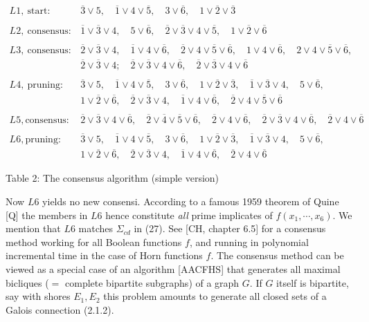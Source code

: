\documentclass[11pt]{article}
\newcommand{\ol}{\overline}
\begin{document}
$\begin{array}{ll}
L1, \ \mbox{start} : & \ol{3} \vee 5, \quad \ol{1} \vee 4 \vee \ol{5}, \quad 3 \vee \ol{6}, \quad 1 \vee \ol{2} \vee \ol{3}\\
\\
L2, \ \mbox{consensus}: & \ol{1} \vee \ol{3} \vee 4, \quad 5 \vee \ol{6}, \quad \ol{2} \vee \ol{3} \vee 4 \vee \ol{5}, \quad 1 \vee \ol{2} \vee \ol{6}\\
\\
L3, \ \mbox{consensus}: &  \ol{2} \vee \ol{3} \vee 4, \quad \ol{1} \vee 4 \vee \ol{6}, \quad \ol{2} \vee 4 \vee \ol{5} \vee \ol{6}, \quad 1 \vee 4 \vee \ol{6}, \quad 2 \vee 4 \vee \ol{5} \vee \ol{6},  \\
& \ol{2} \vee \ol{3} \vee 4; \quad \ol{2} \vee \ol{3} \vee 4 \vee \ol{6}, \quad \ol{2} \vee \ol{3} \vee 4 \vee \ol{6}\\ 
\\
L4, \ \mbox{pruning}: & \ol{3} \vee 5, \quad \ol{1} \vee 4 \vee \ol{5}, \quad 3 \vee \ol{6}, \quad  1 \vee \ol{2} \vee \ol{3}, \quad \ol{1} \vee \ol{3} \vee 4, \quad 5 \vee \ol{6},  \\
& 1 \vee \ol{2} \vee \ol{6}, \quad \ol{2} \vee \ol{3} \vee 4, \quad \ol{1} \vee 4 \vee \ol{6}, \quad \ol{2} \vee 4 \vee \ol{5} \vee \ol{6}\\
\\
L5, \mbox{consensus} : & \ol{2} \vee \ol{3} \vee 4 \vee \ol{6}, \quad \ol{2} \vee \ol{4} \vee \ol{5} \vee \ol{6}, \quad \ol{2} \vee 4 \vee \ol{6}, \quad \ol{2} \vee \ol{3} \vee 4 \vee \ol{6}, \quad \ol{2} \vee 4 \vee \ol{6}\\
\\
L6, \mbox{pruning}: & \ol{3} \vee 5, \quad \ol{1} \vee 4 \vee \ol{5}, \quad 3 \vee \ol{6}, \quad 1 \vee \ol{2} \vee \ol{3}, \quad \ol{1} \vee \ol{3} \vee 4, \quad  5 \vee \ol{6}, \\
 & 1 \vee \ol{2} \vee \ol{6}, \quad \ol{2} \vee \ol{3} \vee 4,\quad \ol{1} \vee 4 \vee \ol{6}, \quad \ol{2} \vee 4 \vee \ol{6}
\end{array}$

Table 2: The consensus  algorithm (simple version)

Now $L6$ yields no new consensi. According to a famous 1959 theorem of Quine [Q] the members in $L6$ hence constitute {\it all} prime implicates of $f(x_1, \cdots, x_6)$. We mention that $L6$ matches $\Sigma_{cd}$ in (27). See [CH, chapter 6.5] for a consensus method working for all Boolean functions $f$, and running in polynomial incremental time in the case of Horn functions $f$. The consensus method can be viewed as a special case of an algorithm [AACFHS] that generates all maximal bicliques ($=$ complete bipartite subgraphs) of a graph $G$. If $G$ itself is bipartite, say with shores $E_1, E_2$ this problem amounts to generate all closed sets of a Galois connection (2.1.2). 
\end{document}
